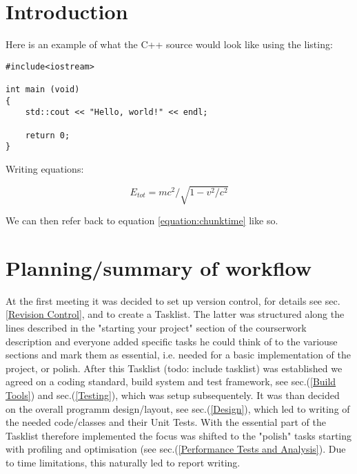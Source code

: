 \documentclass[12pt,a4paper]{article}
\begin{document}
\maketitle
\newpage


\tableofcontents
\newpage


%
%

\section{Introduction}

Here is an example of what the C++ source would look like using the listing: 
 
\begin{lstlisting}
#include<iostream> 

int main (void)
{
	std::cout << "Hello, world!" << endl;

	return 0; 
}
\end{lstlisting}

Writing equations:  

\begin{equation} 
E_{tot} = m c^2 / \sqrt{1 - {v^2/c^2}}
\label{equation:chunktime}
\end{equation}

We can then refer back to equation \ref{equation:chunktime} like so. 


%
%

\section{Planning/summary of workflow}
\label{Planning}
At the first meeting it was decided to set up version control, for details see sec.\ref{Revision Control}, and to create a Tasklist.
The latter was structured along the lines described in the "starting your project" section of the courserwork description and everyone
added specific tasks he could think of to the variouse sections and mark them as essential, i.e. needed for a basic implementation of the project, or polish.
After this Tasklist (todo: include tasklist) was established we agreed on a coding standard, build system and test framework, see sec.(\ref{Build Tools}) and sec.(\ref{Testing}), which was setup subsequentely.
It was than decided on the overall programm design/layout, see sec.(\ref{Design}), which led to writing of the needed code/classes and their Unit Tests.
With the essential part of the Tasklist therefore implemented the focus was shifted to the "polish" tasks starting with profiling and optimisation (see sec.(\ref{Performance Tests and Analysis}).
Due to time limitations, this naturally led to report writing.
\end{document}
